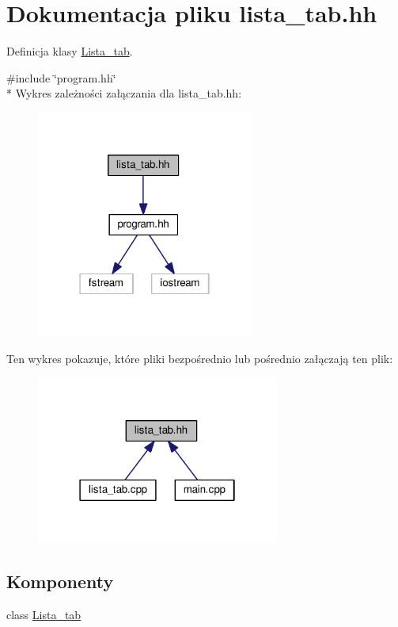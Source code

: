 \hypertarget{lista__tab_8hh}{\section{Dokumentacja pliku lista\-\_\-tab.\-hh}
\label{lista__tab_8hh}
}


Definicja klasy \hyperlink{class_lista__tab}{Lista\-\_\-tab}.  


{\ttfamily \#include \char`\"{}program.\-hh\char`\"{}}\\*
Wykres zależności załączania dla lista\-\_\-tab.\-hh\-:\nopagebreak
\begin{figure}[H]
\begin{center}
\leavevmode
\includegraphics[width=202pt]{lista__tab_8hh__incl}
\end{center}
\end{figure}
Ten wykres pokazuje, które pliki bezpośrednio lub pośrednio załączają ten plik\-:\nopagebreak
\begin{figure}[H]
\begin{center}
\leavevmode
\includegraphics[width=226pt]{lista__tab_8hh__dep__incl}
\end{center}
\end{figure}
\subsection*{Komponenty}
\begin{DoxyCompactItemize}
\item 
class \hyperlink{class_lista__tab}{Lista\-\_\-tab}
\end{DoxyCompactItemize}
